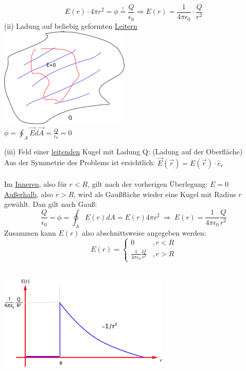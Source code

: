 \documentclass[11pt]{article}
\begin{document}
$$E(r)\cdot4\pi r^2=\phi\overset{!}{=} \frac{Q}{\epsilon_0} \Rightarrow \boxed{{E(r)=\frac{1}{4\pi\epsilon_0}\cdot\frac{Q}{r^2}}}$$
\newpage
(ii) Ladung auf beliebig geformten \underline{Leitern}\\

\includegraphics{skizzen/14/14_6B3}\\

$\phi=\oint_{A}\vec{E}d\vec{A}=\frac{Q}{\epsilon_0}=0$\\
\newpage

(iii) Feld einer \underline{leitenden} Kugel mit Ladung Q: (Ladung auf der Oberfläche)\\

Aus der Symmetrie des Problems ist ersichtlich:
$ \vec{E}(\vec{r})= E(\vec{r})\cdot\hat{e}_r $\\
\\
Im \underline{Inneren}, also für $r<R$, gilt nach der vorherigen Überlegung: $E=0$\\
\underline{Au\ss{}erhalb}, also $r>R$, wird als Gau\ss{}fläche wieder eine Kugel mit Radius $r$ gewählt. Dan  gilt nach Gau\ss{}:
$$\frac{Q}{\epsilon_0}=\phi=\oint_AE(r)dA=E(r)4\pi r^2\ \Rightarrow\ E(r)=\frac{1}{4\pi\epsilon_0}\frac{Q}{r^2}$$
Zusammen kann $E(r)$ also abschnittsweise angegeben werden:
\[
     E(r)=\left\{\begin{array}{ll} 0 & ,r<R \\
         \frac{1}{4\pi\epsilon_0}\frac{Q}{r^2} & ,r>R\end{array}\right.
  \]

\hfill\\

\includegraphics{skizzen/14/14_6B5}\\
\end{document}
